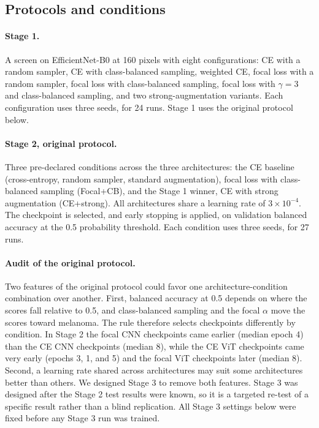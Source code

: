 \subsection{Protocols and conditions}
\label{sec:protocols}

\paragraph{Stage 1.} A screen on EfficientNet-B0 at 160 pixels with eight configurations: CE with a random sampler, CE with class-balanced sampling, weighted CE, focal loss with a random sampler, focal loss with class-balanced sampling, focal loss with $\gamma=3$ and class-balanced sampling, and two strong-augmentation variants. Each configuration uses three seeds, for 24 runs. Stage 1 uses the original protocol below.

\paragraph{Stage 2, original protocol.} Three pre-declared conditions across the three architectures: the CE baseline (cross-entropy, random sampler, standard augmentation), focal loss with class-balanced sampling (Focal+CB), and the Stage 1 winner, CE with strong augmentation (CE+strong). All architectures share a learning rate of $3\times10^{-4}$. The checkpoint is selected, and early stopping is applied, on validation balanced accuracy at the 0.5 probability threshold. Each condition uses three seeds, for 27 runs.

\paragraph{Audit of the original protocol.} Two features of the original protocol could favor one architecture-condition combination over another. First, balanced accuracy at 0.5 depends on where the scores fall relative to 0.5, and class-balanced sampling and the focal $\alpha$ move the scores toward melanoma. The rule therefore selects checkpoints differently by condition. In Stage 2 the focal CNN checkpoints came earlier (median epoch 4) than the CE CNN checkpoints (median 8), while the CE ViT checkpoints came very early (epochs 3, 1, and 5) and the focal ViT checkpoints later (median 8). Second, a learning rate shared across architectures may suit some architectures better than others. We designed Stage 3 to remove both features. Stage 3 was designed after the Stage 2 test results were known, so it is a targeted re-test of a specific result rather than a blind replication. All Stage 3 settings below were fixed before any Stage 3 run was trained.

